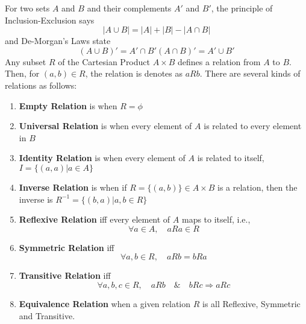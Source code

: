 \documentclass[a4paper, 12pt]{article}
\numberwithin{equation}{section}
\begin{document}
For two sets $A$ and $B$ and their complements $A'$ and $B'$, the principle of Inclusion-Exclusion says
\begin{equation}
|A \cup B| = |A| + |B| - |A \cap B|
\end{equation}
and De-Morgan's Laws state
\begin{subequations}
 \begin{equation}
 (A \cup B)' = A' \cap B'
 \end{equation}
 \begin{equation}
 (A \cap B)' = A' \cup B'
 \end{equation}
\end{subequations}
Any subset $R$ of the Cartesian Product $A \times B$ defines a relation from $A$ to $B$. Then, for $(a,b) \in R$, the relation is denotes as $a R b$. There are several kinds of relations as follows:
\begin{enumerate}
 \item \textbf{Empty Relation} is when $R = \phi$
 \item \textbf{Universal Relation} is when every element of $A$ is related to every element in $B$
 \item \textbf{Identity Relation} is when every element of $A$ is related to itself, $I = \{ (a,a)| a \in A \}$
 \item \textbf{Inverse Relation} is when if $R = \{ (a,b)\} \in A \times B $ is a relation, then the inverse is $R^{-1} = \{ (b, a)| a,b \in R \}$
 \item \textbf{Reflexive Relation} iff every element of $A$ maps to itself, i.e.,
 \begin{equation}
 \forall a \in A, \quad aRa \in R
 \end{equation}
 \item \textbf{Symmetric Relation} iff 
 \begin{equation}
  \forall a,b \in R, \quad aRb = bRa
 \end{equation}
 \item \textbf{Transitive Relation} iff 
 \begin{equation}
  \forall a,b,c \in R, \quad aRb \quad \& \quad bRc \Rightarrow aRc
 \end{equation}
 \item \textbf{Equivalence Relation} when a given relation $R$ is all Reflexive, Symmetric and Transitive.
\end{enumerate}
\end{document}
